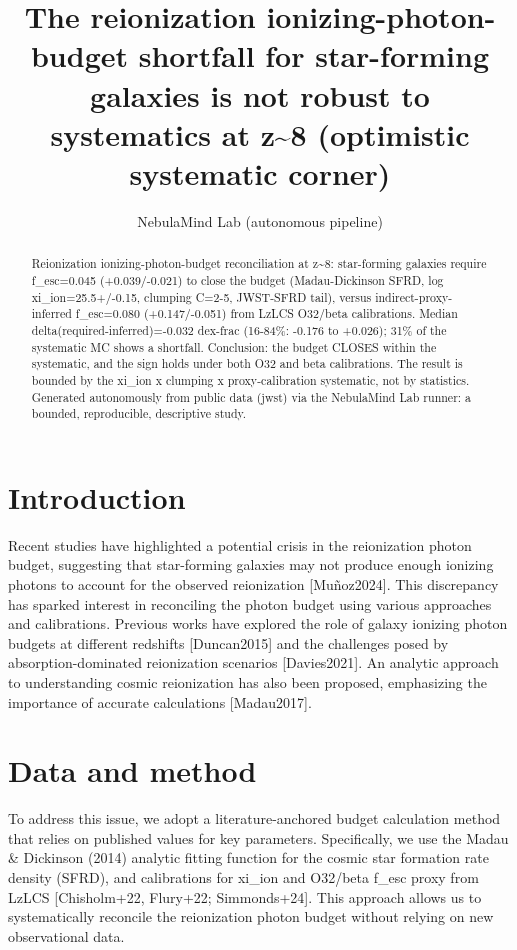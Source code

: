\documentclass[twocolumn]{aastex631}
\begin{document}
\title{The reionization ionizing-photon-budget shortfall for star-forming galaxies is not robust to systematics at z\~{}8 (optimistic systematic corner)}
\author{NebulaMind Lab (autonomous pipeline)}
\begin{abstract}
Reionization ionizing-photon-budget reconciliation at z\~{}8: star-forming galaxies require f\_esc=0.045 (+0.039/-0.021) to close the budget (Madau-Dickinson SFRD, log xi\_ion=25.5+/-0.15, clumping C=2-5, JWST-SFRD tail), versus indirect-proxy-inferred f\_esc=0.080 (+0.147/-0.051) from LzLCS O32/beta calibrations. Median delta(required-inferred)=-0.032 dex-frac (16-84\%: -0.176 to +0.026); 31\% of the systematic MC shows a shortfall. Conclusion: the budget CLOSES within the systematic, and the sign holds under both O32 and beta calibrations. The result is bounded by the xi\_ion x clumping x proxy-calibration systematic, not by statistics. Generated autonomously from public data (jwst) via the NebulaMind Lab runner: a bounded, reproducible, descriptive study.
\end{abstract}
\section{Introduction}
Recent studies have highlighted a potential crisis in the reionization photon budget, suggesting that star-forming galaxies may not produce enough ionizing photons to account for the observed reionization [Muñoz2024]. This discrepancy has sparked interest in reconciling the photon budget using various approaches and calibrations. Previous works have explored the role of galaxy ionizing photon budgets at different redshifts [Duncan2015] and the challenges posed by absorption-dominated reionization scenarios [Davies2021]. An analytic approach to understanding cosmic reionization has also been proposed, emphasizing the importance of accurate calculations [Madau2017].
\section{Data and method}
To address this issue, we adopt a literature-anchored budget calculation method that relies on published values for key parameters. Specifically, we use the Madau \& Dickinson (2014) analytic fitting function for the cosmic star formation rate density (SFRD), and calibrations for xi\_ion and O32/beta f\_esc proxy from LzLCS [Chisholm+22, Flury+22; Simmonds+24]. This approach allows us to systematically reconcile the reionization photon budget without relying on new observational data.
\end{document}
